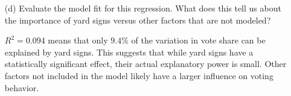 \documentclass[12pt,letterpaper]{article}
\begin{document}
\begin{enumerate}
	\vspace{.5cm}
	\item [(d)] Evaluate the model fit for this regression.  What does this	tell us about the importance of yard signs versus other factors that are not modeled?
	
	\vspace{.5cm}
	$R^2 = 0.094$ means that only $9.4\%$ of the variation in vote share can be explained by yard signs. This suggests that while yard signs have a statistically significant effect, their actual explanatory power is small. Other factors not included in the model likely have a larger influence on voting behavior.
	
\end{enumerate}  
\end{document}
